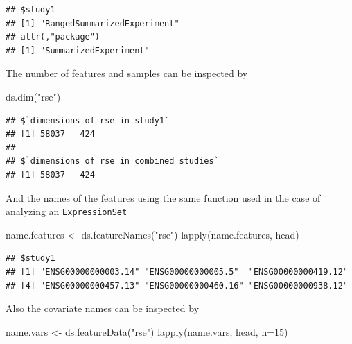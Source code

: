 \documentclass[
]{book}
\newenvironment{Shaded}{\begin{snugshade}}{\end{snugshade}}
\newcommand{\AttributeTok}[1]{\textcolor[rgb]{0.77,0.63,0.00}{#1}}
\newcommand{\DecValTok}[1]{\textcolor[rgb]{0.00,0.00,0.81}{#1}}
\newcommand{\FunctionTok}[1]{\textcolor[rgb]{0.00,0.00,0.00}{#1}}
\newcommand{\NormalTok}[1]{#1}
\newcommand{\OtherTok}[1]{\textcolor[rgb]{0.56,0.35,0.01}{#1}}
\newcommand{\StringTok}[1]{\textcolor[rgb]{0.31,0.60,0.02}{#1}}
\begin{document}
\begin{verbatim}
## $study1
## [1] "RangedSummarizedExperiment"
## attr(,"package")
## [1] "SummarizedExperiment"
\end{verbatim}

The number of features and samples can be inspected by

\begin{Shaded}
\begin{Highlighting}[]
\FunctionTok{ds.dim}\NormalTok{(}\StringTok{"rse"}\NormalTok{)}
\end{Highlighting}
\end{Shaded}

\begin{verbatim}
## $`dimensions of rse in study1`
## [1] 58037   424
## 
## $`dimensions of rse in combined studies`
## [1] 58037   424
\end{verbatim}

And the names of the features using the same function used in the case of analyzing an \texttt{ExpressionSet}

\begin{Shaded}
\begin{Highlighting}[]
\NormalTok{name.features }\OtherTok{\textless{}{-}} \FunctionTok{ds.featureNames}\NormalTok{(}\StringTok{"rse"}\NormalTok{)}
\FunctionTok{lapply}\NormalTok{(name.features, head)}
\end{Highlighting}
\end{Shaded}

\begin{verbatim}
## $study1
## [1] "ENSG00000000003.14" "ENSG00000000005.5"  "ENSG00000000419.12"
## [4] "ENSG00000000457.13" "ENSG00000000460.16" "ENSG00000000938.12"
\end{verbatim}

Also the covariate names can be inspected by

\begin{Shaded}
\begin{Highlighting}[]
\NormalTok{name.vars }\OtherTok{\textless{}{-}} \FunctionTok{ds.featureData}\NormalTok{(}\StringTok{"rse"}\NormalTok{)}
\FunctionTok{lapply}\NormalTok{(name.vars, head, }\AttributeTok{n=}\DecValTok{15}\NormalTok{)}
\end{Highlighting}
\end{Shaded}
\end{document}
